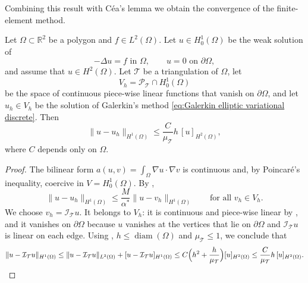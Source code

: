 Combining this result with Céa's lemma we obtain the convergence of the finite-element method.
\begin{strongtheorem}
    \label{thm:FEM convergence linear elements}
    Let $\Omega \subset \mathbb R^2$ be a polygon and $f \in L^2(\Omega)$. Let $u \in H^1_0(\Omega)$ be the weak solution of
    \begin{equation*}
        -\Delta u = f \text{ in } \Omega, \qquad u = 0 \text{ on } \partial \Omega,
    \end{equation*}
    and assume that $u \in H^2(\Omega)$.
    Let $\mathcal T$ be a triangulation of $\Omega$, let
    \begin{equation*}
        V_h = \mathcal P_{\mathcal T} \cap H^1_0(\Omega)
    \end{equation*}
    be the space of continuous piece-wise linear functions that vanish on $\partial \Omega$, and let $u_h \in V_h$ be the solution of Galerkin's method \eqref{eq:Galerkin elliptic variational discrete}. Then
    \begin{equation*}
        \| u - u_h \|_{H^1(\Omega)} \le \frac{C}{\mu_{\mathcal T}} h\, [ u ]_{H^2(\Omega)},
    \end{equation*}
    where $C$ depends only on $\Omega$.
\end{strongtheorem}
\begin{proof}
    The bilinear form $a(u,v) = \int_\Omega \nabla u \cdot \nabla v$ is continuous and, by Poincaré's inequality, coercive in $V = H^1_0(\Omega)$. By ,
    \begin{equation*}
        \| u - u_h \|_{H^1(\Omega)} \le \frac{M}{\alpha^*} \| u - v_h \|_{H^1(\Omega)} \qquad \text{for all } v_h \in V_h.
    \end{equation*}
    We choose $v_h = \mathcal I_{\mathcal T} u$. It belongs to $V_h$: it is continuous and piece-wise linear by , and it vanishes on $\partial \Omega$ because $u$ vanishes at the vertices that lie on $\partial \Omega$ and $\mathcal I_{\mathcal T} u$ is linear on each edge.
    Using , $h \le \operatorname{diam}(\Omega)$ and $\mu_{\mathcal T} \le 1$, we conclude that
    \begin{equation*}
        \| u - \mathcal I_{\mathcal T} u \|_{H^1(\Omega)}
        \le \| u - \mathcal I_{\mathcal T} u \|_{L^2(\Omega)} + [ u - \mathcal I_{\mathcal T} u ]_{H^1(\Omega)}
        \le C \Big( h^2 + \frac{h}{\mu_{\mathcal T}} \Big) [ u ]_{H^2(\Omega)}
        \le \frac{C}{\mu_{\mathcal T}} h\, [ u ]_{H^2(\Omega)}. \qedhere
    \end{equation*}
\end{proof}
